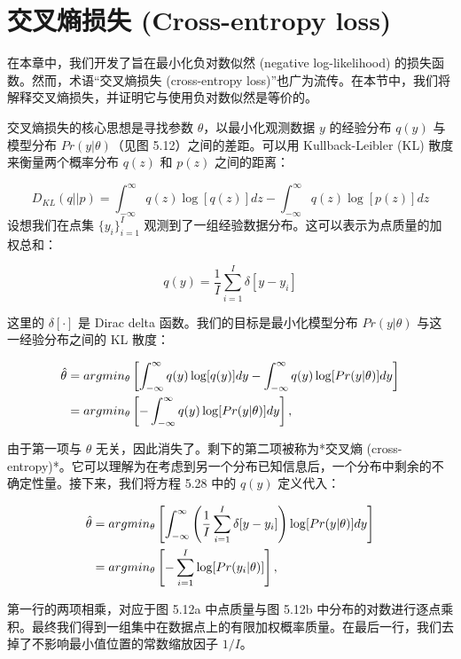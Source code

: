 \documentclass[lang=cn,newtx,10pt,scheme=chinese]{elegantbook}
\begin{document}
\section{交叉熵损失 (Cross-entropy loss)}

在本章中，我们开发了旨在最小化负对数似然 (negative log-likelihood) 的损失函数。然而，术语“交叉熵损失 (cross-entropy loss)”也广为流传。在本节中，我们将解释交叉熵损失，并证明它与使用负对数似然是等价的。

交叉熵损失的核心思想是寻找参数 \(\theta\)，以最小化观测数据 \(y\) 的经验分布 \(q(y)\) 与模型分布 \(Pr(y|\theta)\)（见图 5.12）之间的差距。可以用 Kullback-Leibler (KL) 散度来衡量两个概率分布 \(q(z)\) 和 \(p(z)\) 之间的距离：

\begin{equation}
D_{KL}(q||p) = \int_{-\infty}^{\infty} q(z) \log [q(z)] dz - \int_{-\infty}^{\infty} q(z) \log [p(z)] dz 
\end{equation}
设想我们在点集 \(\{y_i\}^I_{i=1}\) 观测到了一组经验数据分布。这可以表示为点质量的加权总和：

\begin{equation}
q(y) = \frac{1}{I} \sum_{i=1}^{I} \delta[y - y_i] 
\end{equation}

这里的 \(\delta[\cdot]\) 是 Dirac delta 函数。我们的目标是最小化模型分布 \(Pr(y|\theta)\) 与这一经验分布之间的 KL 散度：


\begin{align}
	\hat{\theta} &= argmin_{\theta} \left[ \int_{-\infty}^{\infty} q(y) \log [q(y)] dy - \int_{-\infty}^{\infty} q(y) \log [Pr(y|\theta)] dy \right] \notag \\
	&= argmin_{\theta} \left[ -\int_{-\infty}^{\infty} q(y) \log [Pr(y|\theta)] dy \right], 
\end{align}


由于第一项与 \(\theta\) 无关，因此消失了。剩下的第二项被称为*交叉熵 (cross-entropy)*。它可以理解为在考虑到另一个分布已知信息后，一个分布中剩余的不确定性量。接下来，我们将方程 5.28 中的 \(q(y)\) 定义代入：


\begin{align}
	\hat{\theta} &= argmin_{\theta} \left[ \int_{-\infty}^{\infty} \left( \frac{1}{I} \sum_{i=1}^{I} \delta[y - y_i] \right) \log [Pr(y|\theta)] dy \right] \notag \\
	&= argmin_{\theta} \left[ -\sum_{i=1}^{I} \log [Pr(y_i|\theta)] \right], 
\end{align} 


第一行的两项相乘，对应于图 5.12a 中点质量与图 5.12b 中分布的对数进行逐点乘积。最终我们得到一组集中在数据点上的有限加权概率质量。在最后一行，我们去掉了不影响最小值位置的常数缩放因子 \(1/I\)。
\end{document}
